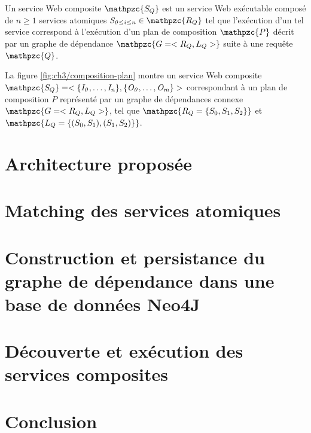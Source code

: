 \begin{mydef}
  Un service Web composite $\mathpzc{S_Q}$ est un service Web
  exécutable composé de $n \geq 1$ services atomiques
  $\mathit{S_{0 \leq i \leq n}} \in \mathpzc{R_Q}$ tel que l'exécution
  d'un tel service correspond à l'exécution d'un plan de composition
  $\mathpzc{P}$ décrit par un graphe de dépendance
  $\mathpzc{G = <R_Q,L_Q>}$ suite à une requête $\mathpzc{Q}$.\medskip
\end{mydef}

La figure \ref{fig:ch3/composition-plan} montre un service Web
composite
$\mathpzc{S_Q} = <\mathit{\{I_0, \dots, I_n\}}, \mathit{\{O_0, \dots,
  O_m\}}>$
correspondant à un plan de composition $P$ représenté par un graphe de
dépendances connexe $\mathpzc{G =<R_Q,L_Q>}$, tel que
$\mathpzc{R_Q = \{S_0, S_1, S_2\}}$ et
$\mathpzc{L_Q = \{(S_0, S_1), (S_1, S_2)\}}$.

\section{Architecture proposée}
\label{sec:proposition}

\section{Matching des services  atomiques}
\label{sec:ch4/matching}

\section{Construction et persistance du graphe de dépendance dans une
  base de données Neo4J}
\section{Découverte et exécution des services composites}

\section*{Conclusion}
\label{sec:conclusion}
 



